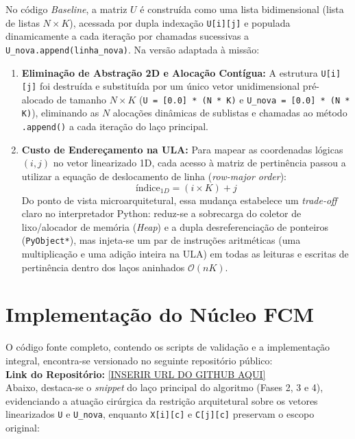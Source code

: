 \documentclass[11pt,a4paper]{article}
\begin{document}
No código \textit{Baseline}, a matriz $U$ é construída como uma lista bidimensional (lista de listas $N \times K$), acessada por dupla indexação \texttt{U[i][j]} e populada dinamicamente a cada iteração por chamadas sucessivas a \texttt{U\_nova.append(linha\_nova)}. Na versão adaptada à missão:
\begin{enumerate}
    \item \textbf{Eliminação de Abstração 2D e Alocação Contígua:} A estrutura \texttt{U[i][j]} foi destruída e substituída por um único vetor unidimensional pré-alocado de tamanho $N \times K$ (\texttt{U = [0.0] * (N * K)} e \texttt{U\_nova = [0.0] * (N * K)}), eliminando as $N$ alocações dinâmicas de sublistas e chamadas ao método \texttt{.append()} a cada iteração do laço principal.
    \item \textbf{Custo de Endereçamento na ULA:} Para mapear as coordenadas lógicas $(i, j)$ no vetor linearizado 1D, cada acesso à matriz de pertinência passou a utilizar a equação de deslocamento de linha (\textit{row-major order}):
    \begin{equation*}
        \text{índice}_{1D} = (i \times K) + j
    \end{equation*}
    Do ponto de vista microarquitetural, essa mudança estabelece um \textit{trade-off} claro no interpretador Python: reduz-se a sobrecarga do coletor de lixo/alocador de memória (\textit{Heap}) e a dupla desreferenciação de ponteiros (\texttt{PyObject*}), mas injeta-se um par de instruções aritméticas (uma multiplicação e uma adição inteira na ULA) em todas as leituras e escritas de pertinência dentro dos laços aninhados $\mathcal{O}(nK)$.
\end{enumerate}

\section{Implementação do Núcleo FCM}
O código fonte completo, contendo os scripts de validação e a implementação integral, encontra-se versionado no seguinte repositório público: \\
\textbf{Link do Repositório:} \href{https://github.com/sCesar-dev/softwareEngineerDocs/blob/main/docs/trabalho03/Relat%C3%B3rio_C2_BigO/relatorio_fcm_missao01.ipynb}{[INSERIR URL DO GITHUB AQUI]} \\

Abaixo, destaca-se o \textit{snippet} do laço principal do algoritmo (Fases 2, 3 e 4), evidenciando a atuação cirúrgica da restrição arquitetural sobre os vetores linearizados \texttt{U} e \texttt{U\_nova}, enquanto \texttt{X[i][c]} e \texttt{C[j][c]} preservam o escopo original:
\end{document}
